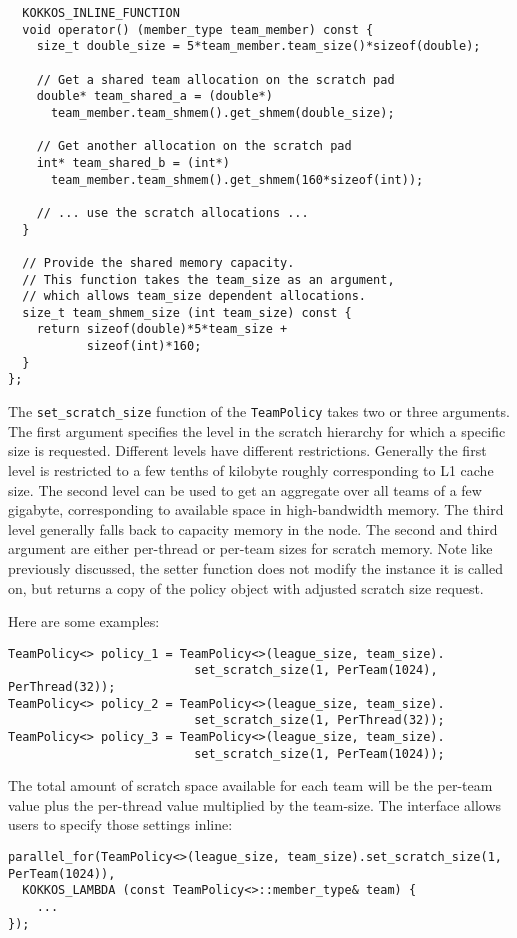 \begin{enumerate}
\begin{lstlisting}
  KOKKOS_INLINE_FUNCTION
  void operator() (member_type team_member) const {
    size_t double_size = 5*team_member.team_size()*sizeof(double);

    // Get a shared team allocation on the scratch pad
    double* team_shared_a = (double*)
      team_member.team_shmem().get_shmem(double_size);

    // Get another allocation on the scratch pad
    int* team_shared_b = (int*)
      team_member.team_shmem().get_shmem(160*sizeof(int));

    // ... use the scratch allocations ...
  }

  // Provide the shared memory capacity.
  // This function takes the team_size as an argument,
  // which allows team_size dependent allocations.
  size_t team_shmem_size (int team_size) const {
    return sizeof(double)*5*team_size +
           sizeof(int)*160;
  }
};
\end{lstlisting}

The \lstinline|set_scratch_size| function of the \lstinline|TeamPolicy| takes two or three arguments.
The first argument specifies the level in the scratch hierarchy for which a specific size is requested. 
Different levels have different restrictions. 
Generally the first level is restricted to a few tenths of kilobyte roughly corresponding to L1 cache size. 
The second level can be used to get an aggregate over all teams of a few gigabyte, corresponding to available 
space in high-bandwidth memory. 
The third level generally falls back to capacity memory in the node. 
The second and third argument are either per-thread or per-team sizes for scratch memory.
Note like previously discussed, the setter function does not modify the instance it is called on, but returns 
a copy of the policy object with adjusted scratch size request. 

Here are some examples:
\begin{lstlisting}
TeamPolicy<> policy_1 = TeamPolicy<>(league_size, team_size).
                          set_scratch_size(1, PerTeam(1024), PerThread(32));
TeamPolicy<> policy_2 = TeamPolicy<>(league_size, team_size).
                          set_scratch_size(1, PerThread(32));
TeamPolicy<> policy_3 = TeamPolicy<>(league_size, team_size).
                          set_scratch_size(1, PerTeam(1024));
\end{lstlisting} 

The total amount of scratch space available for each team will be the per-team value plus the per-thread value multiplied by the team-size. 
The interface allows users to specify those settings inline:
\begin{lstlisting}
parallel_for(TeamPolicy<>(league_size, team_size).set_scratch_size(1, PerTeam(1024)),
  KOKKOS_LAMBDA (const TeamPolicy<>::member_type& team) {
    ...
});
\end{lstlisting}


\end{enumerate}
